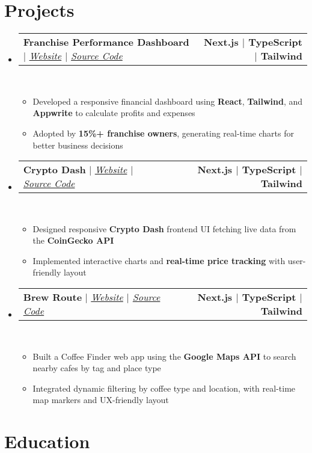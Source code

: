\documentclass[letterpaper,11pt]{article}
\makeatletter
\newcommand{\resumeItem}[1]{
  \item\small{
    {#1 \vspace{0pt}}
  }
}
\newcommand{\resumeProjectHeading}[2]{
    \item
    \begin{tabular*}{1.001\textwidth}{l@{\extracolsep{\fill}}r}
      \small#1 & \textbf{\small #2}\\
    \end{tabular*}\vspace{-7pt}
}
\newcommand{\resumeSubHeadingListStart}{\begin{itemize}[leftmargin=0.0in, label={}]}
\newcommand{\resumeSubHeadingListEnd}{\end{itemize}}\vspace{0pt}
\newcommand{\resumeItemListStart}{\begin{itemize}}
\newcommand{\resumeItemListEnd}{\end{itemize}\vspace{-5pt}}
\makeatother
\begin{document}
\section{Projects} 
    \vspace{-2pt}
    \resumeSubHeadingListStart
    \resumeProjectHeading
            {\textbf{{Franchise Performance Dashboard}} $|$ \emph{\href{https://biz-boost-five.vercel.app/dashboard}{Website}{ $|$ }\href{https://github.com/SawSimonLinn/BizBoost}{Source Code}}}{Next.js $|$ TypeScript $|$ Tailwind}
            \\[5mm]
   \resumeItemListStart
  \resumeItem{Developed a responsive financial dashboard using \textbf{React}, \textbf{Tailwind}, and \textbf{Appwrite} to calculate profits and expenses}
  \resumeItem{Adopted by \textbf{15\%+ franchise owners}, generating real-time charts for better business decisions}
\resumeItemListEnd

 \vspace{-20pt}
 \resumeProjectHeading
{\textbf{{ Crypto Dash}} $|$ \emph{\href{https://crypto-dash-redesign.vercel.app/}{Website}{ $|$ }\href{https://github.com/SawSimonLinn/crypto-dash-redesign}{Source Code}}}{Next.js $|$ TypeScript $|$ Tailwind}
\\[5mm]
\resumeItemListStart
  \resumeItem{Designed responsive \textbf{Crypto Dash} frontend UI fetching live data from the \textbf{CoinGecko API}}
  \resumeItem{Implemented interactive charts and \textbf{real-time price tracking} with user-friendly layout}
\resumeItemListEnd


 \vspace{-17pt}

 \resumeProjectHeading
{\textbf{{ Brew Route }} $|$ \emph{\href{https://brew-route.vercel.app/}{Website}{ $|$ }\href{https://github.com/SawSimonLinn/brewRoute}{Source Code}}}{Next.js $|$ TypeScript $|$ Tailwind}
\\[5mm]
\resumeItemListStart
  \resumeItem{Built a Coffee Finder web app using the \textbf{Google Maps API} to search nearby cafes by tag and place type}
  \resumeItem{Integrated dynamic filtering by coffee type and location, with real-time map markers and UX-friendly layout}
\resumeItemListEnd



\resumeSubHeadingListEnd
\vspace{-13pt}

\section{Education}
\end{document}
